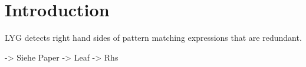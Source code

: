 \chapter{Introduction}\label{sec:intro}

LYG detects right hand sides of
pattern matching expressions that are
redundant.

-> Siehe Paper
-> Leaf -> Rhs